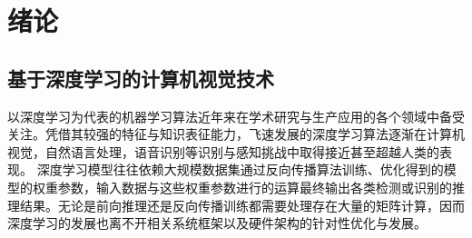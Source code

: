 
\chapter{绪论}

\section{基于深度学习的计算机视觉技术} \label{intro_dl}
以深度学习为代表的机器学习算法近年来在学术研究与生产应用的各个领域中备受关注。凭借其较强的特征与知识表征能力，飞速发展的深度学习算法逐渐在计算机视觉，自然语言处理，语音识别等识别与感知挑战中取得接近甚至超越人类的表现\cite{he2016deep, hochreiter1997long, hinton2012deep}。%
深度学习模型往往依赖大规模数据集通过反向传播算法训练、优化得到的模型的权重参数，输入数据与这些权重参数进行的运算最终输出各类检测或识别的推理结果\cite{lecun2015deep}。无论是前向推理还是反向传播训练都需要处理存在大量的矩阵计算，因而深度学习的发展也离不开相关系统框架以及硬件架构的针对性优化与发展。\par

